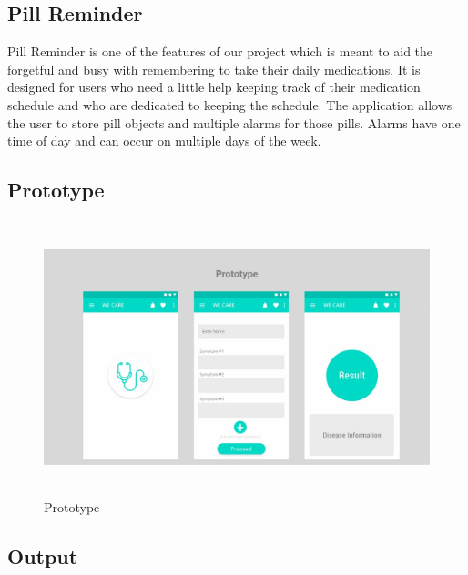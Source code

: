 {\subsection{Pill Reminder}
Pill Reminder is one of the features of our project which is meant to aid the forgetful and busy with remembering to take their daily medications. It is designed for users who need a little help keeping track of their medication schedule and who are dedicated to keeping the schedule. The application allows the user to store pill objects and multiple alarms for those pills. Alarms have one time of day and can occur on multiple days of the week.

\subsection{Prototype}
\begin{figure}[H]
\begin{center}
\includegraphics[width=130mm, height = 80mm]{images/prototype.jpg}
\caption{Prototype}
\end{center}
\end{figure}

\subsection{Output}

}
